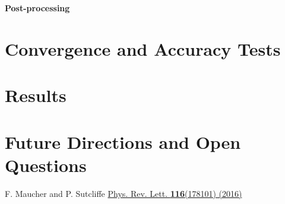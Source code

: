 \documentclass[notitlepage,aps,amsmath,amssymb,11pt]{revtex4-1}
\begin{document}
{\bf Post-processing} 



\section{Convergence and Accuracy Tests}

\section{Results}

\section{Future Directions and Open Questions}

\begin{thebibliography}{10}
 F. Maucher and P. Sutcliffe \href{http://dx.doi.org/10.1103/PhysRevLett.116.178101}{Phys. Rev. Lett. {\bf 116}(178101) (2016)}

\end{thebibliography}
\end{document}
